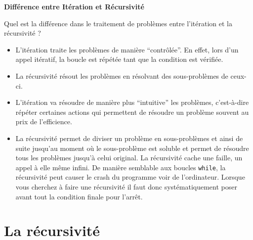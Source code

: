 \begin{Exercice}[10 minutes]
\begin{solution}
        \end{solution}
    \end{Exercice}
    
    \begin{Exercice}[5 minutes] \textbf{Différence entre Itération et Récursivité}
      	
      	Quel est la différence dans le traitement de problèmes entre l'itération et la récursivité ?
    
        \begin{conseil}
        
           \begin{itemize}
               \item L'itération traite les problèmes de manière ``contrôlée''. En effet, lors d'un appel itératif, la boucle est répétée tant que la condition est vérifiée.
           	\item La récursivité résout les problèmes en résolvant des sous-problèmes de ceux-ci.
           \end{itemize}
		     
        \end{conseil}
        
        \begin{solution}
        	\begin{itemize}
            \item L'itération va résoudre de manière plus ``intuitive'' les problèmes, c'est-à-dire répéter certaines actions qui permettent de résoudre un problème souvent au prix de l'efficience.
            \item La récursivité permet de diviser un problème en sous-problèmes et ainsi de suite jusqu'au moment où le sous-problème est soluble et permet de résoudre tous les problèmes jusqu'à celui original. La récursivité cache une faille, un appel à elle même infini. De manière semblable aux boucles \lstinline{while}, la récursivité peut causer le crash du programme voir de l'ordinateur. Lorsque vous cherchez à faire une récursivité il faut donc systématiquement poser avant tout la condition finale pour l'arrêt.
           \end{itemize}
        \end{solution}
    \end{Exercice}
    
    
    \section{La récursivité}
    
